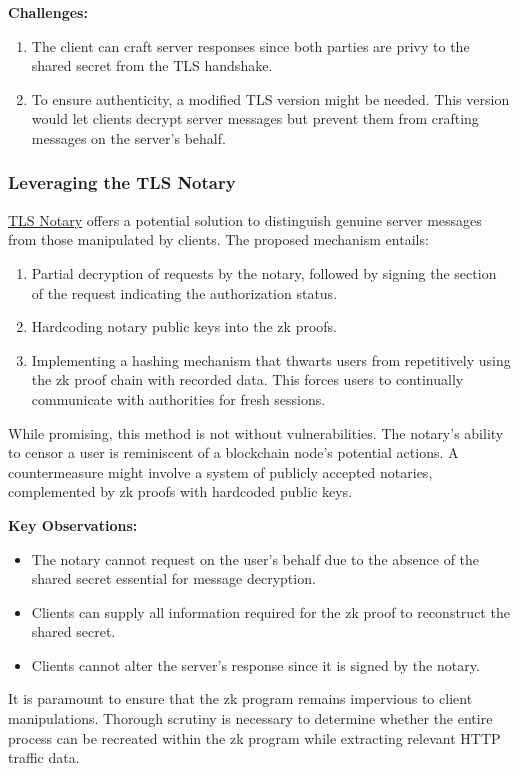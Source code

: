 \documentclass{article}
\begin{document}
\textbf{Challenges:}
\begin{enumerate}
    \item The client can craft server responses since both parties are privy to the shared secret from the TLS handshake.
    \item To ensure authenticity, a modified TLS version might be needed. This version would let clients decrypt server messages but prevent them from crafting messages on the server's behalf.
\end{enumerate}

\subsubsection{Leveraging the TLS Notary}

\href{https://docs.tlsnotary.org/}{TLS Notary} offers a potential solution to distinguish genuine server messages from those manipulated by clients. The proposed mechanism entails:
\begin{enumerate}
    \item Partial decryption of requests by the notary, followed by signing the section of the request indicating the authorization status.
    \item Hardcoding notary public keys into the zk proofs.
    \item Implementing a hashing mechanism that thwarts users from repetitively using the zk proof chain with recorded data. This forces users to continually communicate with authorities for fresh sessions.
\end{enumerate}

While promising, this method is not without vulnerabilities. The notary's ability to censor a user is reminiscent of a blockchain node's potential actions. A countermeasure might involve a system of publicly accepted notaries, complemented by zk proofs with hardcoded public keys.

\textbf{Key Observations:}
\begin{itemize}
    \item The notary cannot request on the user's behalf due to the absence of the shared secret essential for message decryption.
    \item Clients can supply all information required for the zk proof to reconstruct the shared secret.
    \item Clients cannot alter the server's response since it is signed by the notary.
\end{itemize}

It is paramount to ensure that the zk program remains impervious to client manipulations. Thorough scrutiny is necessary to determine whether the entire process can be recreated within the zk program while extracting relevant HTTP traffic data.
\end{document}
